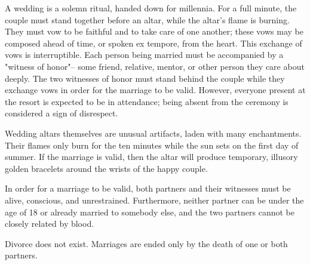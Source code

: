 \documentclass[green]{Kos}
\begin{document}
\name{\gWedding{}}

A wedding is a solemn ritual, handed down for millennia. For a full minute, the couple must stand together before an altar, while the altar's flame is burning. They must vow to be faithful and to take care of one another; these vows may be composed ahead of time, or spoken ex tempore, from the heart. This exchange of vows is interruptible. Each person being married must be accompanied by a "witness of honor"-- some friend, relative, mentor, or other person they care about deeply. The two witnesses of honor must stand behind the couple while they exchange vows in order for the marriage to be valid. However, everyone present at the resort is expected to be in attendance; being absent from the ceremony is considered a sign of disrespect.

Wedding altars themselves are unusual artifacts, laden with many enchantments. Their flames only burn for the ten minutes while the sun sets on the first day of summer. If the marriage is valid, then the altar will produce temporary, illusory golden bracelets around the wrists of the happy couple.

In order for a marriage to be valid, both partners and their witnesses must be alive, conscious, and unrestrained. Furthermore, neither partner can be under the age of 18 or already married to somebody else, and the two partners cannot be closely related by blood.

Divorce does not exist. Marriages are ended only by the death of one or both partners.
\end{document}
